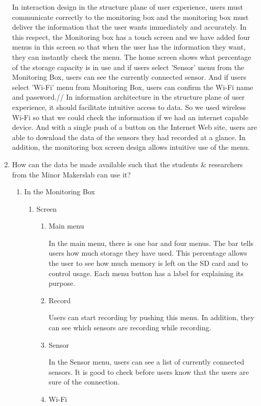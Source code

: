 \documentclass[conference]{IEEEtran}
\begin{document}
\begin{enumerate}
				In interaction design in the structure plane of user experience, users must communicate correctly to the monitoring box and the monitoring box must deliver the information that the user wants immediately and accurately. In this respect, the Monitoring box has a touch screen and we have added four menus in this screen so that when the user has the information they want, they can instantly check the menu. The home screen shows what percentage of the storage capacity is in use and if users select 'Sensor' menu from the Monitoring Box, users can see the currently connected sensor. And if users select 'Wi-Fi' menu from Monitoring Box, users can confirm the Wi-Fi name and password.//
				In information architecture in the structure plane of user experience, it should facilitate intuitive access to data. So we used wireless Wi-Fi so that we could check the information if we had an internet capable device. And with a single push of a button on the Internet Web site, users are able to download the data of the sensors they had recorded at a glance. In addition, the monitoring box screen design allows intuitive use of the menu.
\\

			\item How can the data be made available such that the students \& researchers from the Minor Makerslab can use it?
				\begin{enumerate}
					\item In the Monitoring Box
				\begin{enumerate}
			\item Screen
				\begin{enumerate}
					\item Main menu

						In the main menu, there is one bar and four menus. The bar tells users how much storage they have used. This percentage allows the user to see how much memory is left on the SD card and to control usage. Each menu button has a label for explaining its purpose.\\
					\item Record

						Users can start recording by pushing this menu. In addition, they can see which sensors are recording while recording.\\
					\item Sensor

						In the Sensor menu, users can see a list of currently connected sensors. It is good to check before users know that the users are sure of the connection.\\
					\item Wi-Fi


\end{enumerate}
\end{enumerate}
\end{enumerate}
\end{enumerate}
\end{document}
